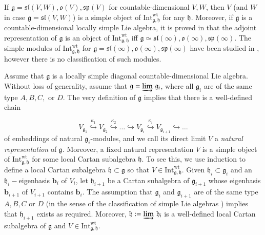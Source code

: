 \documentclass{svmult}
\newcommand{\wt}{\mathrm{wt}}
\renewcommand{\sp}{\mathfrak{sp}}
\renewcommand{\sl}{\mathfrak{sl}}
\newcommand{\oj}{\mathfrak{g}}
\newcommand{\oo}{\mathfrak{o}}
\newcommand{\hh}{\mathfrak{h}}
\renewcommand{\gg}{\mathfrak{g}}
\newcommand{\Int}{\mathrm{Int}}
\begin{document}
If $\gg = \sl(V,W), \oo(V), \sp(V)$ for countable-dimensional $V,W$, then $V$ (and $W$ in case $\gg = \sl(V,W)$) is a simple object of $\Int^{\wt}_{\gg,\hh}$ for any $\hh$. Moreover, if $\gg$ is a countable-dimensional locally simple Lie algebra, it is proved in \cite{pstr} that the adjoint representation of $\gg$ is an object of $\Int^{\wt}_{\gg,\hh}$ iff $\gg \simeq \sl(\infty), \oo(\infty), \sp(\infty)$. The simple modules of $\Int^{\wt}_{\gg,\hh}$ for $\gg = \sl(\infty),\oo(\infty),\sp(\infty)$ have been studied in \cite{dip}, however there is no classification of such modules.

Assume that $\gg$ is a locally simple diagonal countable-dimensional Lie algebra. Without loss of generality, assume that $\gg = \varinjlim\,\gg_i$, where all $\gg_i$ are of the same type $A,B,C,$ or $D$. The very definition of $\gg$ implies that there is a well-defined chain

\begin{equation}\label{inf_ch_nat}
 V_{\oj_{1}} \stackrel{\kappa_1}{\hookrightarrow} V_{\oj_{2}} \stackrel{\kappa_2}{\hookrightarrow} \dots \hookrightarrow V_{\oj_{i}} \stackrel{\kappa_i}{\hookrightarrow} V_{\oj_{i+1}} \hookrightarrow \dots
\end{equation}
of embeddings of natural $\oj_i$-modules, and we call its direct limit $V$ a \textit{natural representation} of $\oj$. Moreover, a fixed natural representation $V$ is a simple object of $\Int^{\wt}_{\gg,\hh}$ for some local Cartan subalgebra $\hh$. To see this, we use induction to define a local Cartan subalgebra $\hh \subset \gg$ so that $V \in \Int^{\wt}_{\gg,\hh}$. Given $\hh_i \subset \gg_i$ and an $\hh_i-$eigenbasis $\textbf{b}_{i}$ of $V_{i}$, let $\hh_{i+1}$ be a Cartan subalgebra of $\gg_{i+1}$ whose eigenbasis $\textbf{b}_{i+1}$ of $V_{i+1}$ contains $\textbf{b}_i$. The assumption that $\gg_i$ and $\gg_{i+1}$ are of the same type $A,B,C$ or $D$ (in the sense of the classification of simple Lie algebras \cite{Bou}) implies that $\hh_{i+1}$ exists as required. Moreover, $\hh:=\varinjlim\,\hh_i$ is a well-defined local Cartan subalgebra of $\gg$ and  $V \in \Int^{\wt}_{\gg,\hh}$.
\end{document}
